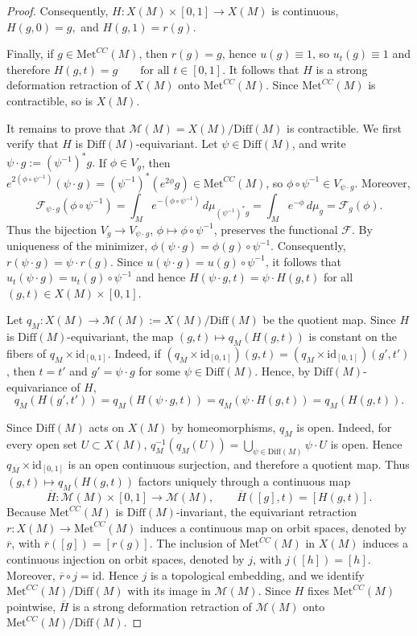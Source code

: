 \documentclass[12pt,oneside,a4paper]{article}
\theoremstyle{mytheorem}
\theoremstyle{remark}
\theoremstyle{definition}
\begin{document}
\begin{proof}
Consequently,
\(H\colon X(M)\times[0,1]\to X(M)\)
is continuous,  $H(g,0)=g,$ and  $H(g,1)=r(g).$


Finally, if $g\in \mathrm{Met}^{CC}(M)$, then $r(g)=g$, hence $u(g)\equiv 1$,
so $u_t(g)\equiv 1$ and therefore
\(
H(g,t)=g\qquad\text{for all }t\in[0,1].
\)
It follows that $H$ is a strong deformation retraction of $X(M)$ onto
$\mathrm{Met}^{CC}(M)$. Since $\mathrm{Met}^{CC}(M)$ is contractible, so is $X(M)$.

It remains to prove that $\mathcal{M}(M)=X(M)/\mathrm{Diff}(M)$ is contractible.
We first verify that $H$ is $\mathrm{Diff}(M)$-equivariant. Let $\psi\in\mathrm{Diff}(M)$, and write
\(
\psi\cdot g:=(\psi^{-1})^*g.
\)
If $\phi\in V_g$, then
\(e^{2(\phi\circ\psi^{-1})}(\psi\cdot g)
=(\psi^{-1})^*(e^{2\phi}g)\in \mathrm{Met}^{CC}(M)\),
so $\phi\circ\psi^{-1}\in V_{\psi\cdot g}$. Moreover,
\[
\mathcal F_{\psi\cdot g}(\phi\circ\psi^{-1})
=\int_M e^{-(\phi\circ\psi^{-1})}\,d\mu_{(\psi^{-1})^*g}
=\int_M e^{-\phi}\,d\mu_g
=\mathcal F_g(\phi).
\]
Thus the bijection
\(V_g\to V_{\psi\cdot g}\),
\(\phi\longmapsto \phi\circ\psi^{-1}\),
preserves the functional $\mathcal F$. By uniqueness of the minimizer,
$\phi(\psi\cdot g)=\phi(g)\circ\psi^{-1}.$ Consequently,
$r(\psi\cdot g)=\psi\cdot r(g).$ Since $u(\psi\cdot g)=u(g)\circ\psi^{-1}$, it follows that $u_t(\psi\cdot g)=u_t(g)\circ\psi^{-1}$ and hence
\(H(\psi\cdot g,t)=\psi\cdot H(g,t)\)
for all \((g,t)\in X(M)\times[0,1]\).

Let
\(q_M\colon X(M)\to \mathcal{M}(M):=X(M)/\mathrm{Diff}(M)\)
be the quotient map. Since \(H\) is \(\mathrm{Diff}(M)\)-equivariant, the map
$(g,t)\mapsto q_M(H(g,t))$ is constant on the fibers of
$q_M\times \mathrm{id}_{[0,1]}$. Indeed, if
\((q_M\times \mathrm{id}_{[0,1]})(g,t)=(q_M\times \mathrm{id}_{[0,1]})(g',t')\),
then \(t=t'\) and \(g'=\psi\cdot g\) for some \(\psi\in \mathrm{Diff}(M)\). Hence, by
\(\mathrm{Diff}(M)\)-equivariance of \(H\),
\[
q_M(H(g',t'))=q_M(H(\psi\cdot g,t))
=q_M(\psi\cdot H(g,t))=q_M(H(g,t)).
\]

Since $\mathrm{Diff}(M)$ acts on $X(M)$ by homeomorphisms, $q_M$ is open. Indeed,
for every open set $U\subset X(M)$,
\(q_M^{-1}(q_M(U))
=
\bigcup_{\psi\in\mathrm{Diff}(M)}\psi\cdot U\)
is open. Hence $q_M\times\mathrm{id}_{[0,1]}$ is an open continuous
surjection, and therefore a quotient map. Thus $(g,t)\mapsto q_M(H(g,t))$
factors uniquely through a continuous map
\[
\overline H\colon\mathcal{M}(M)\times[0,1]\longrightarrow \mathcal{M}(M),
\qquad
\overline H([g],t)=[H(g,t)].
\]
Because $\mathrm{Met}^{CC}(M)$ is $\mathrm{Diff}(M)$-invariant, the
equivariant retraction
$r\colon X(M)\to \mathrm{Met}^{CC}(M)$ induces a continuous map
on orbit spaces, denoted by $\overline r$, with
$\overline r([g])=[r(g)]$. The inclusion of $\mathrm{Met}^{CC}(M)$ in
$X(M)$ induces a continuous injection on orbit spaces, denoted by $j$, with
$j([h])=[h]$. Moreover,
$\overline r\circ j=\mathrm{id}$. Hence $j$ is a topological embedding, and
we identify $\mathrm{Met}^{CC}(M)/\mathrm{Diff}(M)$ with its image in
$\mathcal{M}(M)$. Since $H$ fixes $\mathrm{Met}^{CC}(M)$ pointwise,
$\overline H$ is a strong deformation retraction of $\mathcal{M}(M)$ onto
$\mathrm{Met}^{CC}(M)/\mathrm{Diff}(M)$.


\end{proof}
\end{document}
